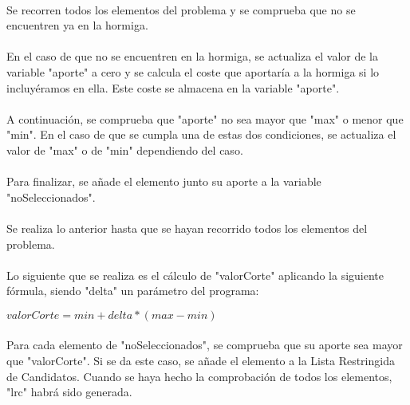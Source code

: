 	\paragraph{}Se recorren todos los elementos del problema y se comprueba que no se encuentren ya en la hormiga.
	
	\paragraph{}En el caso de que no se encuentren en la hormiga, se actualiza el valor de la variable "aporte" a cero y se calcula el coste que aportaría a la hormiga si lo incluyéramos en ella. Este coste se almacena en la variable "aporte".
	
	\paragraph{}A continuación, se comprueba que "aporte" no sea mayor que "max" o menor que "min". En el caso de que se cumpla una de estas dos condiciones, se actualiza el valor de "max" o de "min" dependiendo del caso.
	
	\paragraph{}Para finalizar, se añade el elemento junto su aporte a la variable "noSeleccionados".
	
	\paragraph{}Se realiza lo anterior hasta que se hayan recorrido todos los elementos del problema.
	
	\paragraph{} Lo siguiente que se realiza es el cálculo de "valorCorte" aplicando la siguiente fórmula, siendo "delta" un parámetro del programa:
	
	\begin{center}
		$valorCorte = min + delta * ( max - min )$
	\end{center}
	
	\paragraph{}Para cada elemento de "noSeleccionados", se comprueba que su aporte sea mayor que "valorCorte". Si se da este caso, se añade el elemento a la Lista Restringida de Candidatos. Cuando se haya hecho la comprobación de todos los elementos, "lrc" habrá sido generada.
	
